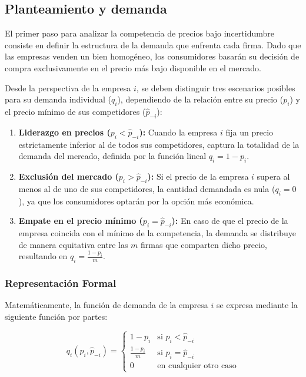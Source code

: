 \documentclass[12pt]{article}
\begin{document}
\subsection{Planteamiento y demanda}

El primer paso para analizar la competencia de precios bajo incertidumbre consiste en definir la estructura de la demanda que enfrenta cada firma. Dado que las empresas venden un bien homogéneo, los consumidores basarán su decisión de compra exclusivamente en el precio más bajo disponible en el mercado.

Desde la perspectiva de la empresa $i$, se deben distinguir tres escenarios posibles para su demanda individual ($q_i$), dependiendo de la relación entre su precio ($p_i$) y el precio mínimo de sus competidores ($\hat{p}_{-i}$):

\begin{enumerate}
    \item \textbf{Liderazgo en precios ($p_i < \hat{p}_{-i}$):} Cuando la empresa $i$ fija un precio estrictamente inferior al de todos sus competidores, captura la totalidad de la demanda del mercado, definida por la función lineal $q_i = 1 - p_i$.
    
    \item \textbf{Exclusión del mercado ($p_i > \hat{p}_{-i}$):} Si el precio de la empresa $i$ supera al menos al de uno de sus competidores, la cantidad demandada es nula ($q_i = 0$), ya que los consumidores optarán por la opción más económica.
    
    \item \textbf{Empate en el precio mínimo ($p_i = \hat{p}_{-i}$):} En caso de que el precio de la empresa coincida con el mínimo de la competencia, la demanda se distribuye de manera equitativa entre las $m$ firmas que comparten dicho precio, resultando en $q_i = \frac{1 - p_i}{m}$.
\end{enumerate}

\subsubsection{Representación Formal}

Matemáticamente, la función de demanda de la empresa $i$ se expresa mediante la siguiente función por partes:

\begin{equation}
    q_{i}(p_{i}, \hat{p}_{-i}) = 
    \begin{cases} 
        1 - p_{i} & \text{si } p_{i} < \hat{p}_{-i} \\ 
        \frac{1 - p_{i}}{m} & \text{si } p_{i} = \hat{p}_{-i} \\ 
        0 & \text{en cualquier otro caso} 
    \end{cases}
\end{equation}
\end{document}
